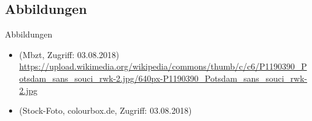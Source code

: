 \iftoggle{uebung}{
\begin{frame}
\frametitle{Hausaufgabe}

\begin{itemize}
\item Geben Sie den Wahrheitswert der folgenden Formeln in einer Welt/Situation an, in der $p=0$ und $q=1$ sind.
\end{itemize}

\ea\label{ex:Wert1} $(p \land q)$
\ex\label{ex:Wert2} $(p \rightarrow (q \lor p))$
\ex\label{ex:Wert3} $((q \land q) \lor (p \land q))$
\z 

\end{frame}

} 
{
\begin{frame}
\frametitle{Hausaufgabe -- Lösung}

\begin{itemize}
\item Geben Sie den Wahrheitswert der folgenden Formeln in einer Welt/Situation an, in der $p=0$ und $q=1$ sind.
\end{itemize}

\ea\label{ex:Wert1} $(p \land q)$
\ex\label{ex:Wert2} $(p \rightarrow (q \lor p))$
\ex\label{ex:Wert3} $((q \land q) \lor (p \land q))$
\z 
\end{frame}


\begin{frame}
\frametitle{Hausaufgabe -- Lösung}

\begin{itemize}
\item Geben Sie den Wahrheitswert der folgenden Formeln in einer Welt/Situation an, in der $p=0$ und $q=1$ sind.
\end{itemize}

\begin{exe}
\exr{ex:Wert1} $(p \land q)$ \pause  \alertred{= 0}
\exr{ex:Wert2} $(p \rightarrow (q \lor p))$ \pause \alertred{= 1}
\exr{ex:Wert1} $((q \land q) \lor (p \land q))$ \pause \alertred{= 1}
\end{exe}
\end{frame}

}%

\subsection{Abbildungen}
\begin{frame}{Abbildungen}
\small

\begin{itemize}
	\item {} (Mbzt, Zugriff: 03.08.2018) \url{https://upload.wikimedia.org/wikipedia/commons/thumb/c/c6/P1190390_Potsdam_sans_souci_rwk-2.jpg/640px-P1190390_Potsdam_sans_souci_rwk-2.jpg}
	\item {} (Stock-Foto, colourbox.de, Zugriff: 03.08.2018)
\end{itemize}	

\end{frame}

